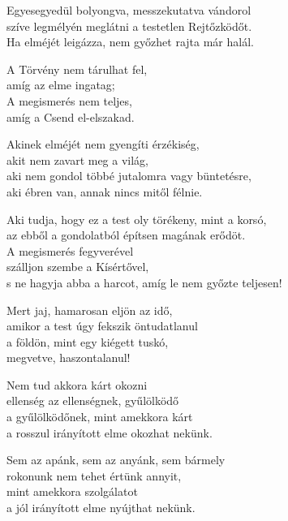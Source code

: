 \begin{dhpverse}

 Egyesegyedül bolyongva, messzekutatva vándorol\\
szíve legmélyén meglátni a testetlen Rejtőzködőt.\\
Ha elméjét leigázza, nem győzhet rajta már halál.

 A Törvény nem tárulhat fel,\\
amíg az elme ingatag;\\
A megismerés nem teljes,\\
amíg a Csend el-elszakad.

 Akinek elméjét nem gyengíti érzékiség,\\
akit nem zavart meg a világ,\\
aki nem gondol többé jutalomra vagy büntetésre,\\
aki ébren van, annak nincs mitől félnie.

 Aki tudja, hogy ez a test oly törékeny, mint a korsó,\\
az ebből a gondolatból építsen magának erődöt.\\
A megismerés fegyverével\\
szálljon szembe a Kísértővel,\\
s ne hagyja abba a harcot, amíg le nem győzte teljesen!

 Mert jaj, hamarosan eljön az idő,\\
amikor a test úgy fekszik öntudatlanul\\
a földön, mint egy kiégett tuskó,\\
megvetve, haszontalanul!

 Nem tud akkora kárt okozni\\
ellenség az ellenségnek, gyűlölködő\\
a gyűlölködőnek, mint amekkora kárt\\
a rosszul irányított elme okozhat nekünk.

\end{dhpverse}
\newpage
\begin{dhpverse}

 Sem az apánk, sem az anyánk, sem bármely\\
rokonunk nem tehet értünk annyit,\\
mint amekkora szolgálatot\\
a jól irányított elme nyújthat nekünk.

\end{dhpverse}
